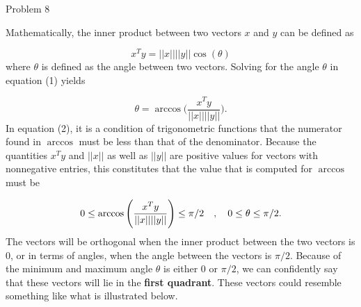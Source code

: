 \begin{problem}{Problem 8}
\begin{Highlight}[Solution]
        Mathematically, the inner product between two vectors $x$ and $y$ can be defined as

        \setcounter{equation}{0}
        \begin{equation}
            x^{T}y = ||x||||y||\cos{(\theta)}
        \end{equation}
        where $\theta$ is defined as the angle between two vectors. Solving for the angle $\theta$ in equation (1) yields 

        \begin{equation}
            \theta = \arccos{\Bigg(\frac{x^{T}y}{||x||||y||}\Bigg)}.
        \end{equation}
        In equation (2), it is a condition of trigonometric functions that the numerator found in $\arccos$ must be less than that of the denominator. Because the quantities $x^{T}y$ and $||x||$ as 
        well as $||y||$ are positive values for vectors with nonnegative entries, this constitutes that the value that is computed for $\arccos$ must be

        \begin{equation}
            0 \leq \arccos{\Bigg(\frac{x^{T}y}{||x||||y||}\Bigg)} \leq \pi / 2 \hspace*{10pt} , \hspace*{10pt} 0 \leq \theta \leq \pi / 2.
        \end{equation}
        The vectors will be orthogonal when the inner product between the two vectors is 0, or in terms of angles, when the angle between the vectors is $\pi / 2$. Because of the minimum and maximum angle 
        $\theta$ is either 0 or $\pi / 2$, we can confidently say that these vectors will lie in the \textbf{first quadrant}. These vectors could resemble something like what is illustrated below.


\end{Highlight}
\end{problem}
